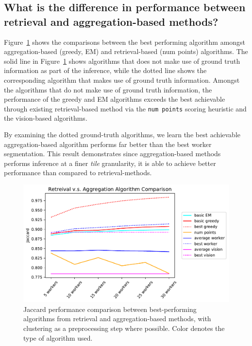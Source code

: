   \subsection{What is the difference in performance between retrieval and aggregation-based methods?}
    Figure~\ref{retreival_vs_aggregation} shows the comparisons between the best performing algorithm amongst aggregation-based (greedy, EM) and retrieval-based (num points) algorithms. The solid line in Figure~\ref{retreival_vs_aggregation} shows algorithms that does not make use of ground truth information as part of the inference, while the dotted line shows the corresponding algorithm that makes use of ground truth information. Amongst the algorithms that do not make use of ground truth information, the performance of the greedy and EM algorithms exceeds the best achievable through existing retrieval-based method via the \texttt{num points} scoring heuristic and the vision-based algorithms. 
    \par By examining the dotted ground-truth algorithms, we learn the best achievable aggregation-based algorithm performs far better than the best worker segmentation. This result demonstrates since aggregation-based methods performs inference at a finer \textit{tile} granularity, it is able to achieve better performance than compared to retrieval-methods.
    \begin{figure}[h!]
      \centering
      \includegraphics[width=\textwidth]{plots/Retreival_vs_Aggregation.pdf}
      \caption{Jaccard performance comparison between best-performing algorithms from retrieval and aggregation-based methods, with clustering as a preprocessing step where possible. Color denotes the type of algorithm used.}
      \label{retreival_vs_aggregation}
    \end{figure}
